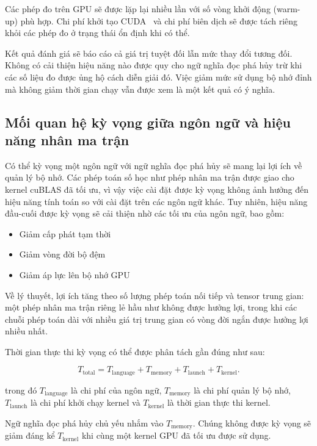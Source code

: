 \documentclass[a4paper]{article}
\begin{document}
	Các phép đo trên GPU sẽ được lặp lại nhiều lần với số vòng khởi động (warm-up) phù hợp. Chi phí khởi tạo CUDA~\cite{CUDA} và chi phí biên dịch sẽ được tách riêng khỏi các phép đo ở trạng thái ổn định khi có thể.
	
	Kết quả đánh giá sẽ báo cáo cả giá trị tuyệt đối lẫn mức thay đổi tương đối. Không có cải thiện hiệu năng nào được quy cho ngữ nghĩa đọc phá hủy trừ khi các số liệu đo được ủng hộ cách diễn giải đó. Việc giảm mức sử dụng bộ nhớ đỉnh mà không giảm thời gian chạy vẫn được xem là một kết quả có ý nghĩa.
	
	
	
	\subsection{Mối quan hệ kỳ vọng giữa ngôn ngữ và hiệu năng nhân ma trận}
	
	Có thể kỳ vọng một ngôn ngữ với ngữ nghĩa đọc phá hủy sẽ mang lại lợi ích về quản lý bộ nhớ. Các phép toán số học như phép nhân ma trận được giao cho kernel cuBLAS đã tối ưu, vì vậy việc cài đặt được kỳ vọng không ảnh hưởng đến hiệu năng tính toán so với cài đặt trên các ngôn ngữ khác. Tuy nhiên, hiệu năng đầu-cuối được kỳ vọng sẽ cải thiện nhờ các tối ưu của ngôn ngữ, bao gồm:
	\begin{itemize} 
		\item Giảm cấp phát tạm thời
		\item Giảm vòng đời bộ đệm
		\item Giảm áp lực lên bộ nhớ GPU
	\end{itemize}
	Về lý thuyết, lợi ích tăng theo số lượng phép toán nối tiếp và tensor trung gian: một phép nhân ma trận riêng lẻ hầu như không được hưởng lợi, trong khi các chuỗi phép toán dài với nhiều giá trị trung gian có vòng đời ngắn được hưởng lợi nhiều nhất.
	
	Thời gian thực thi kỳ vọng có thể được phân tách gần đúng như sau:
	
	\begin{equation}
		T_{\mathrm{total}} =
		T_{\mathrm{language}} +
		T_{\mathrm{memory}} +
		T_{\mathrm{launch}} +
		T_{\mathrm{kernel}}.
	\end{equation}
	
	\noindent trong đó $T_{\mathrm{language}}$ là chi phí của ngôn ngữ, $T_{\mathrm{memory}}$ là chi phí quản lý bộ nhớ, $T_{\mathrm{launch}}$ là chi phí khởi chạy kernel và $T_{\mathrm{kernel}}$ là thời gian thực thi kernel.
	
	Ngữ nghĩa đọc phá hủy chủ yếu nhắm vào $T_{\mathrm{memory}}$. Chúng không được kỳ vọng sẽ giảm đáng kể $T_{\mathrm{kernel}}$ khi cùng một kernel GPU đã tối ưu được sử dụng.
	
\end{document}
